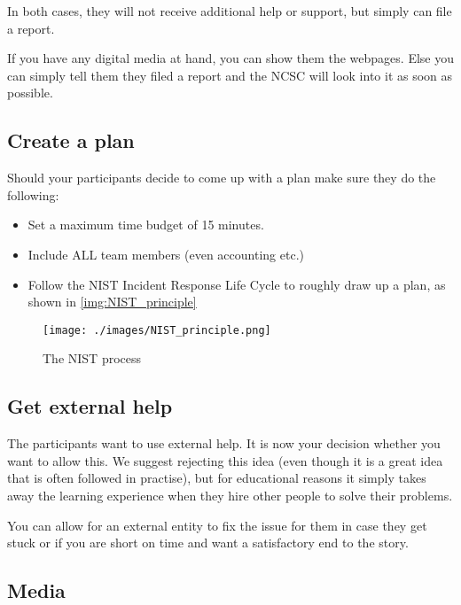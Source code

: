 In both cases, they will not receive additional help or support, but simply can file a report.

\begin{hint}
    If you have any digital media at hand, you can show them the webpages.
    Else you can simply tell them they filed a report and the NCSC will look into it as soon as possible.
\end{hint}
\subsection{Create a plan}

Should your participants decide to come up with a plan make sure they do the following:

\begin{itemize}
    \item Set a maximum time budget of 15 minutes.
    \item Include ALL team members (even accounting etc.)
    \item Follow the NIST Incident Response Life Cycle to roughly draw up a plan, as shown in \autoref{img:NIST_principle}
\end{itemize}

\begin{figure}[h!p]
    \centering
    \texttt{[image: ./images/NIST\_principle.png]}
    \caption{The NIST process}
    \label{img:NIST_principle}
\end{figure}


\subsection{Get external help}

The participants want to use external help.
It is now your decision whether you want to allow this.
We suggest rejecting this idea (even though it is a great idea that is often followed in practise), but for educational reasons it simply takes away the learning experience when they hire other people to solve their problems.
\\

\begin{hint}
    You can allow for an external entity to fix the issue for them in case they get stuck or if you are short on time and want a satisfactory end to the story.
\end{hint}
\subsection{Media}

